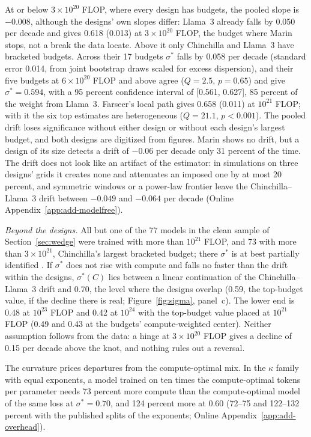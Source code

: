 At or below $3\times10^{20}$ FLOP, where every design has budgets, the pooled
slope is $-0.008$, although the designs' own slopes differ: Llama~3 already falls by 0.050 per decade and gives 0.618
(0.013) at $3\times10^{20}$ FLOP, the budget where Marin stops, not a break the data locate. Above it only Chinchilla and
Llama~3 have bracketed budgets. Across their 17 budgets $\sigma^*$ falls by 0.058 per decade (standard error
0.014, from joint bootstrap draws scaled for excess dispersion), and their five budgets at $6\times10^{20}$ FLOP and above
agree ($Q=2.5$, $p=0.65$) and give $\sigma^*=0.594$, with a 95 percent confidence interval of [0.561, 0.627], 85 percent
of the weight from Llama~3. Farseer's local path gives 0.658 (0.011) at $10^{21}$ FLOP; with it the six top estimates
are heterogeneous ($Q=21.1$, $p<0.001$). The pooled drift loses significance without either design or without each
design's largest budget, and both designs are digitized from figures. Marin shows no drift, but a design of its size
detects a drift of $-0.06$ per decade only 31 percent of the time. The drift does not look like an artifact of the
estimator: in simulations on three designs' grids it creates none and attenuates an imposed one by at most 20 percent,
and symmetric windows or a power-law frontier leave the Chinchilla--Llama~3 drift between $-0.049$ and $-0.064$ per
decade (Online Appendix~\ref{app:add-modelfree}).

\textit{Beyond the designs.} All but one of the 77 models in the clean sample of Section~\ref{sec:wedge} were trained
with more than $10^{21}$ FLOP, and 73 with more than $3\times10^{21}$, Chinchilla's largest bracketed budget; there
$\sigma^*$ is at best partially identified \citep{manski2003partial}. If $\sigma^*$ does not rise with compute and falls
no faster than the drift within the designs, $\sigma^*(C)$ lies between a linear continuation of the Chinchilla--Llama~3
drift and 0.70, the level where the designs overlap (0.59, the top-budget value, if the decline there is real;
Figure~\ref{fig:sigma}, panel~c). The lower end is 0.48 at $10^{23}$ FLOP and 0.42 at $10^{24}$ with the
top-budget value placed at $10^{21}$ FLOP (0.49 and 0.43 at the budgets' compute-weighted center). Neither assumption
follows from the data: a hinge at $3\times10^{20}$ FLOP gives a decline of 0.15 per decade above the knot, and nothing
rules out a reversal.

The curvature prices departures from the compute-optimal mix. In the $\kappa$ family with equal exponents, a
model trained on ten times the compute-optimal tokens per parameter needs 73 percent more compute than the
compute-optimal model of the same loss at $\sigma^*=0.70$, and 124 percent more at 0.60 (72--75 and 122--132 percent
with the published splits of the exponents; Online Appendix~\ref{app:add-overhead}).

